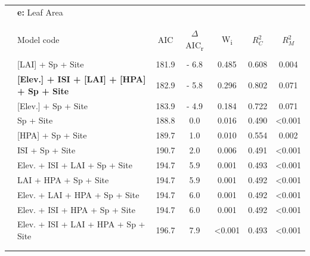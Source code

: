 \documentclass[a4paper,10pt,]{report}
\begin{document}
\begin{table}[H] \centering 
  \label{} 
\begin{tabular}{@{\extracolsep{5pt}} clSSSSS} 
& \textbf{\Large{e:}} Leaf Area &&&&&\\
\\[-1.8ex]\hline 
\hline \\[-1.8ex] 
 & Model code  & {AIC} & {$\Delta$AIC\textsubscript{r}} & {W\textsubscript{i}} & {$R_C^2$} & {$R_M^2$} \\ 
\hline \\[-1.8ex] 
 & [LAI] + Sp + Site &  181.9  &   - 6.8  &  0.485  &  0.608  &  0.004  \\ 
 & \textbf{[Elev.] + ISI + [LAI] + [HPA] + Sp + Site} &  182.9  &   - 5.8  &  0.296  &  0.802  &  0.071  \\ 
 & [Elev.] + Sp + Site &  183.9  &   - 4.9  &  0.184  &  0.722  &  0.071  \\ 
 & Sp + Site &  188.8  &  0.0  &  0.016  &  0.490  &  <0.001  \\ 
 & [HPA] + Sp + Site &  189.7  &  1.0  &  0.010  &  0.554  &  0.002  \\ 
 & ISI + Sp + Site &  190.7  &  2.0  &  0.006  &  0.491  &  <0.001  \\ 
 & Elev. + ISI + LAI + Sp + Site &  194.7  &  5.9  &  0.001  &  0.493  &  <0.001  \\ 
 & LAI + HPA + Sp + Site &  194.7  &  5.9  &  0.001  &  0.492  &  <0.001  \\ 
 & Elev. + LAI + HPA + Sp + Site &  194.7  &  6.0  &  0.001  &  0.492  &  <0.001  \\ 
 & Elev. + ISI + HPA + Sp + Site &  194.7  &  6.0  &  0.001  &  0.492  &  <0.001  \\ 
 & Elev. + ISI + LAI + HPA + Sp + Site &  196.7  &  7.9  &  <0.001  &  0.493  &  <0.001  \\ 
\hline \\[-1.8ex] 
\hline\\

\end{tabular} 
\end{table} 
\end{document}
